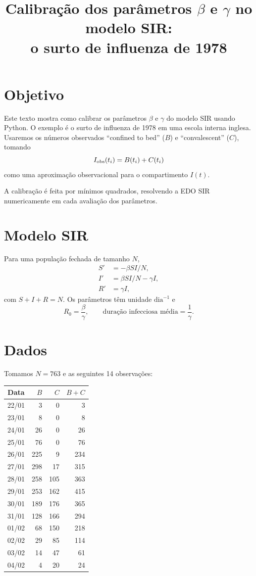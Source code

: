\documentclass[11pt,a4paper]{article}
\title{Calibração dos parâmetros $\beta$ e $\gamma$ no modelo SIR:\\
o surto de influenza de 1978}
\author{}
\date{}
\begin{document}
\maketitle

\section{Objetivo}
Este texto mostra como calibrar os parâmetros $\beta$ e $\gamma$ do modelo
SIR usando Python. O exemplo é o surto de influenza de 1978 em uma escola
interna inglesa. Usaremos os números observados ``confined to bed'' ($B$)
e ``convalescent'' ($C$), tomando
\[
 I_{\rm obs}(t_i)=B(t_i)+C(t_i)
\]
como uma aproximação observacional para o compartimento $I(t)$.

A calibração é feita por mínimos quadrados, resolvendo a EDO SIR
numericamente em cada avaliação dos parâmetros.

\section{Modelo SIR}
Para uma população fechada de tamanho $N$,
\begin{align}
S'&=-\beta SI/N,\\
I'&=\beta SI/N-\gamma I,\\
R'&=\gamma I,
\end{align}
com $S+I+R=N$. Os parâmetros têm unidade $\mathrm{dia}^{-1}$ e
\[
R_0=\frac{\beta}{\gamma},\qquad
\text{duração infecciosa média}=\frac1\gamma.
\]

\section{Dados}
Tomamos $N=763$ e as seguintes 14 observações:

\begin{center}
\begin{tabular}{c|r|r|r}
Data & $B$ & $C$ & $B+C$\\ \hline
22/01&3&0&3\\
23/01&8&0&8\\
24/01&26&0&26\\
25/01&76&0&76\\
26/01&225&9&234\\
27/01&298&17&315\\
28/01&258&105&363\\
29/01&253&162&415\\
30/01&189&176&365\\
31/01&128&166&294\\
01/02&68&150&218\\
02/02&29&85&114\\
03/02&14&47&61\\
04/02&4&20&24
\end{tabular}
\end{center}
\end{document}
